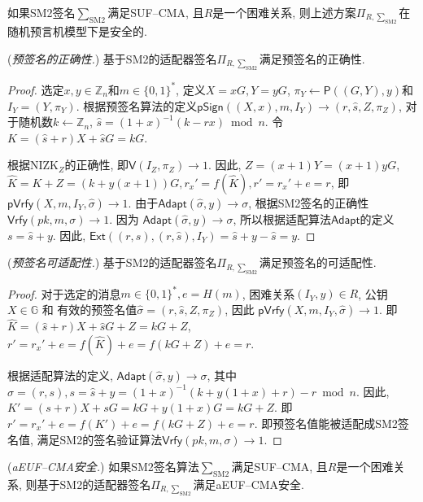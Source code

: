 \documentclass[review]{jcr}
\begin{document}
\begin{theorem}
如果SM2签名$\sum_{\text{SM2}}$满足SUF–CMA, 且$R$是一个困难关系, 则上述方案$\Pi_{R,\sum_{\text{SM2}}}$在随机预言机模型下是安全的. 
\end{theorem}

\begin{lemma}(\emph{预签名的正确性.}) 基于SM2的适配器签名$\Pi_{R,\sum_{\text{SM2}}}$满足预签名的正确性. 
\end{lemma}

\begin{proof}
选定$x,y\in \mathbb{Z}_n$和$m\in \{0,1\}^*$, 定义$X=xG, Y=yG$, $\pi_Y\leftarrow \mathsf{P}((G,Y), y)$和$I_Y=(Y, \pi_Y)$. 根据预签名算法的定义$\mathsf{pSign}((X,x),m,I_Y)\rightarrow (r,\hat{s},Z,\pi_Z)$, 对于随机数$k\leftarrow \mathbb{Z}_n$,  $\hat{s}=(1+x)^{-1}(k-rx) \bmod n$.  令 $K=(\hat{s}+r)X+\hat{s}G=kG$. 

根据NIZK$_Z$的正确性, 即$\mathsf{V}(I_Z, \pi_Z)\rightarrow 1$. 因此, $Z=(x+1)Y=(x+1)yG$, $\hat{K}=K+Z=(k+y(x+1))G, r_x'=f(\hat{K}), r'=r_x'+e=r$, 即 $\mathsf{pVrfy}(X,m,I_Y,\hat{\sigma})\rightarrow 1$. 由于$\mathsf{Adapt}(\hat{\sigma}, y)\rightarrow \sigma$, 根据SM2签名的正确性 $\mathsf{Vrfy}(pk,m,\sigma)\rightarrow 1$. 因为 $\mathsf{Adapt}(\hat{\sigma}, y)\rightarrow \sigma$, 所以根据适配算法$\mathsf{Adapt}$的定义$s=\hat{s}+y$. 因此, 
$\mathsf{Ext}((r,s),(r,\hat{s}),I_Y)=\hat{s}+y-\hat{s}=y.$
\end{proof}

\begin{lemma}(\emph{预签名可适配性.}) 基于SM2的适配器签名$\Pi_{R,\sum_{\text{SM2}}}$满足预签名的可适配性. 
\end{lemma}

\begin{proof}
对于选定的消息$m\in \{0,1\}^*, e=H(m)$, 困难关系$(I_Y,y)\in R$, 公钥$X\in \mathbb{G}$ 和 有效的预签名值$\hat{\sigma} = (r, \hat{s}, Z, \pi_Z)$, 因此 $\mathsf{pVrfy}(X,m,I_Y,\hat{\sigma})\rightarrow 1$. 即
$\hat{K}=(\hat{s}+r)X+\hat{s}G+Z=kG+Z$, $r'=r_x'+e=f(\hat{K})+e=f(kG+Z)+e=r$. 

根据适配算法的定义, $\mathsf{Adapt}(\hat{\sigma}, y)\rightarrow \sigma$, 其中$\sigma=(r,s), s = \hat{s}+y = (1+x)^{-1}(k+y(1+x)+r)-r\bmod n$.  因此,  
$K'=(s+r)X+sG=kG+y(1+x)G=kG+Z.$
即 $r'=r_x'+e=f(K')+e=f(kG+Z)+e=r$. 即预签名值能被适配成SM2签名值, 满足SM2的签名验证算法$\mathsf{Vrfy}(pk,m,\sigma)\rightarrow 1$. 
\end{proof}

\begin{lemma}(\emph{aEUF–CMA安全.}) 如果SM2签名算法$\sum_{\text{SM2}}$满足SUF–CMA, 且$R$是一个困难关系, 则基于SM2的适配器签名$\Pi_{R,\sum_{\text{SM2}}}$满足aEUF–CMA安全. 
\end{lemma}
\end{document}
